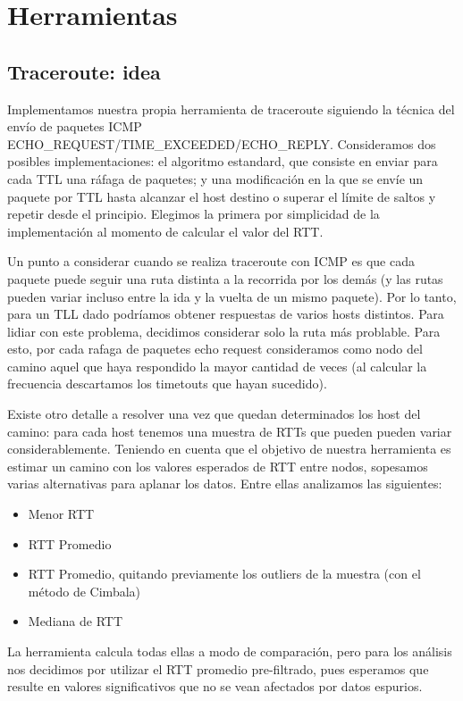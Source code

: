 \section{Herramientas}

\subsection{Traceroute: idea}

Implementamos nuestra propia herramienta de traceroute siguiendo la técnica del envío de paquetes ICMP ECHO\_REQUEST/TIME\_EXCEEDED/ECHO\_REPLY. Consideramos dos posibles implementaciones: el algoritmo estandard, que consiste en enviar para cada TTL una ráfaga de paquetes; y una modificación en la que se envíe un paquete por TTL hasta alcanzar el host destino o superar el límite de saltos y repetir desde el principio. Elegimos la primera por simplicidad de la implementación al momento de calcular el valor del RTT.

Un punto a considerar cuando se realiza traceroute con ICMP es que cada paquete puede seguir una ruta distinta a la recorrida por los demás (y las rutas  pueden variar incluso entre la ida y la vuelta de un mismo paquete). Por lo tanto, para un TLL dado podríamos obtener respuestas de varios hosts distintos. Para lidiar con este problema, decidimos considerar solo la ruta más problable. Para esto, por cada rafaga de paquetes echo request consideramos como nodo del camino aquel que haya respondido la mayor cantidad de veces (al calcular la frecuencia descartamos los timetouts que hayan sucedido).

Existe otro detalle a resolver una vez que quedan determinados los host del camino: para cada host tenemos una muestra de RTTs que pueden  pueden variar considerablemente. Teniendo en cuenta que el objetivo de nuestra herramienta es estimar un camino con los valores esperados de RTT entre nodos, sopesamos varias alternativas para aplanar los datos. Entre ellas analizamos las siguientes:
\begin{itemize}
\item{Menor RTT}
\item{RTT Promedio}
\item{RTT Promedio, quitando previamente los outliers de la muestra (con el método de Cimbala)}
\item{Mediana de RTT}
\end{itemize}
La herramienta calcula todas ellas a modo de comparación, pero para los análisis nos decidimos por utilizar el RTT promedio pre-filtrado, pues esperamos que resulte en valores significativos que no se vean afectados por datos espurios. 


